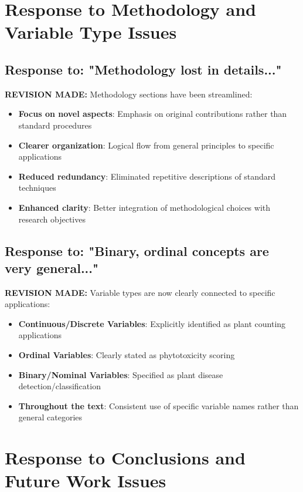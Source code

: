 \documentclass[11pt,a4paper]{article}
\begin{document}
\section{Response to Methodology and Variable Type Issues}

\subsection{Response to: "Methodology lost in details..."}

\textbf{REVISION MADE:} Methodology sections have been streamlined:
\begin{itemize}
\item \textbf{Focus on novel aspects}: Emphasis on original contributions rather than standard procedures
\item \textbf{Clearer organization}: Logical flow from general principles to specific applications
\item \textbf{Reduced redundancy}: Eliminated repetitive descriptions of standard techniques
\item \textbf{Enhanced clarity}: Better integration of methodological choices with research objectives
\end{itemize}

\subsection{Response to: "Binary, ordinal concepts are very general..."}

\textbf{REVISION MADE:} Variable types are now clearly connected to specific applications:
\begin{itemize}
\item \textbf{Continuous/Discrete Variables}: Explicitly identified as plant counting applications
\item \textbf{Ordinal Variables}: Clearly stated as phytotoxicity scoring
\item \textbf{Binary/Nominal Variables}: Specified as plant disease detection/classification
\item \textbf{Throughout the text}: Consistent use of specific variable names rather than general categories
\end{itemize}

\section{Response to Conclusions and Future Work Issues}
\end{document}
